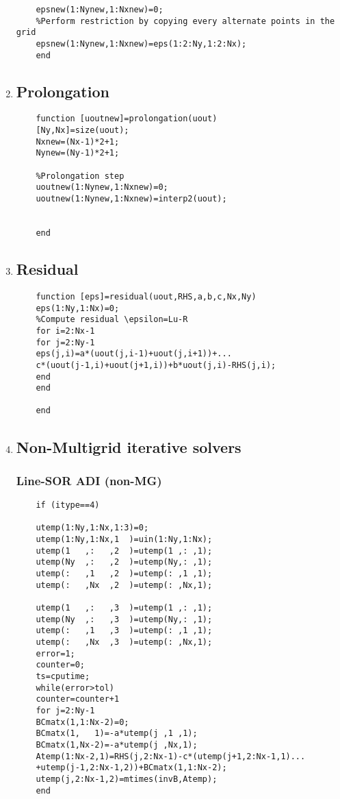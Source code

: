 \documentclass[11pt]{report}
\begin{document}
\begin{appendices}
\begin{enumerate}
\begin{verbatim}
	epsnew(1:Nynew,1:Nxnew)=0;
	%Perform restriction by copying every alternate points in the grid
	epsnew(1:Nynew,1:Nxnew)=eps(1:2:Ny,1:2:Nx);
	end
	\end{verbatim}
	\item 
	\subsection*{Prolongation}
	\begin{verbatim}
	function [uoutnew]=prolongation(uout)
	[Ny,Nx]=size(uout);
	Nxnew=(Nx-1)*2+1;
	Nynew=(Ny-1)*2+1;
	
	%Prolongation step
	uoutnew(1:Nynew,1:Nxnew)=0;
	uoutnew(1:Nynew,1:Nxnew)=interp2(uout);
	
	
	end
	\end{verbatim}
	\item 
	\subsection*{Residual}
	
	\begin{verbatim}
	function [eps]=residual(uout,RHS,a,b,c,Nx,Ny)
	eps(1:Ny,1:Nx)=0;
	%Compute residual \epsilon=Lu-R
	for i=2:Nx-1
	for j=2:Ny-1
	eps(j,i)=a*(uout(j,i-1)+uout(j,i+1))+...
	c*(uout(j-1,i)+uout(j+1,i))+b*uout(j,i)-RHS(j,i);
	end
	end
	
	end
	\end{verbatim}
	\item 
	\subsection*{Non-Multigrid iterative solvers}
	\subsubsection*{Line-SOR ADI (non-MG)}
	
	\begin{verbatim}
	if (itype==4)
	
	utemp(1:Ny,1:Nx,1:3)=0;
	utemp(1:Ny,1:Nx,1  )=uin(1:Ny,1:Nx);
	utemp(1   ,:   ,2  )=utemp(1 ,: ,1);
	utemp(Ny  ,:   ,2  )=utemp(Ny,: ,1);
	utemp(:   ,1   ,2  )=utemp(: ,1 ,1);
	utemp(:   ,Nx  ,2  )=utemp(: ,Nx,1);
	
	utemp(1   ,:   ,3  )=utemp(1 ,: ,1);
	utemp(Ny  ,:   ,3  )=utemp(Ny,: ,1);
	utemp(:   ,1   ,3  )=utemp(: ,1 ,1);
	utemp(:   ,Nx  ,3  )=utemp(: ,Nx,1);
	error=1;
	counter=0;
	ts=cputime;
	while(error>tol)
	counter=counter+1
	for j=2:Ny-1
	BCmatx(1,1:Nx-2)=0;
	BCmatx(1,   1)=-a*utemp(j ,1 ,1);
	BCmatx(1,Nx-2)=-a*utemp(j ,Nx,1);
	Atemp(1:Nx-2,1)=RHS(j,2:Nx-1)-c*(utemp(j+1,2:Nx-1,1)...
	+utemp(j-1,2:Nx-1,2))+BCmatx(1,1:Nx-2);
	utemp(j,2:Nx-1,2)=mtimes(invB,Atemp);
	end
	

\end{verbatim}
\end{enumerate}
\end{appendices}
\end{document}
